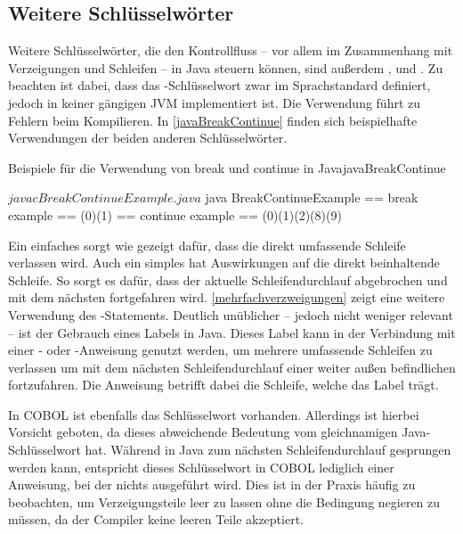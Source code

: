 
\subsection{Weitere Schlüsselwörter}

Weitere Schlüsselwörter, die den Kontrollfluss -- vor allem im Zusammenhang mit Verzeigungen und Schleifen -- in Java steuern können, sind außerdem ,  und . Zu beachten ist dabei, dass das -Schlüsselwort zwar im Sprachstandard definiert, jedoch in keiner gängigen JVM implementiert ist. Die Verwendung führt zu Fehlern beim Kompilieren. In \autoref{javaBreakContinue} finden sich beispielhafte Verwendungen der beiden anderen Schlüsselwörter.

\begin{codeWithCaption}{Beispiele für die Verwendung von break und continue in Java}{javaBreakContinue}
\begin{shellwindow}
$ javac BreakContinueExample.java 
$ java BreakContinueExample
== break example == 
(0)(1)
== continue example == 
(0)(1)(2)(8)(9)
\end{shellwindow}
\end{codeWithCaption}

Ein einfaches  sorgt wie gezeigt dafür, dass die direkt umfassende Schleife verlassen wird. Auch ein simples  hat Auswirkungen auf die direkt beinhaltende Schleife. So sorgt es dafür, dass der aktuelle Schleifendurchlauf abgebrochen und mit dem nächsten fortgefahren wird. \autoref{mehrfachverzweigungen} zeigt eine weitere Verwendung des -Statements. Deutlich unüblicher -- jedoch nicht weniger relevant -- ist der Gebrauch eines Labels in Java. Dieses Label kann in der Verbindung mit einer - oder -Anweisung genutzt werden, um mehrere umfassende Schleifen zu verlassen \bzw um mit dem nächsten Schleifendurchlauf einer weiter außen befindlichen fortzufahren. Die Anweisung betrifft dabei die Schleife, welche das Label trägt. 

In COBOL ist ebenfalls das Schlüsselwort  vorhanden. Allerdings ist hierbei Vorsicht geboten, da dieses abweichende Bedeutung vom gleichnamigen Java-Schlüsselwort hat. Während in Java zum nächsten Schleifendurchlauf gesprungen werden kann, entspricht dieses Schlüsselwort in COBOL lediglich einer Anweisung, bei der nichts ausgeführt wird. Dies ist in der Praxis häufig zu beobachten, um \zB Verzeigungsteile leer zu lassen ohne die Bedingung negieren zu müssen, da der Compiler keine leeren Teile akzeptiert.


